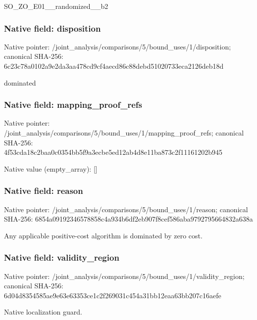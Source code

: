 \documentclass[10pt,a4paper]{article}
\begin{document}
\begingroup\raggedright\sloppy SO\_\allowbreak{}ZO\_\allowbreak{}E01\_\allowbreak{}\_\allowbreak{}randomized\_\allowbreak{}\_\allowbreak{}b2\par\endgroup

\subsubsection{Native field: disposition}
Native pointer: /joint\_\allowbreak{}analysis/comparisons/5/bound\_\allowbreak{}uses/1/disposition; canonical SHA-256: 6c23c78a0102a9e2da3aa478cd9cf4aecd86c88debd51020733eca2126deb18d

\begingroup\raggedright\sloppy dominated\par\endgroup

\subsubsection{Native field: mapping\_\allowbreak{}proof\_\allowbreak{}refs}
Native pointer: /joint\_\allowbreak{}analysis/comparisons/5/bound\_\allowbreak{}uses/1/mapping\_\allowbreak{}proof\_\allowbreak{}refs; canonical SHA-256: 4f53cda18c2baa0c0354bb5f9a3ecbe5ed12ab4d8e11ba873c2f11161202b945

Native value (empty\_\allowbreak{}array): []

\subsubsection{Native field: reason}
Native pointer: /joint\_\allowbreak{}analysis/comparisons/5/bound\_\allowbreak{}uses/1/reason; canonical SHA-256: 6854a09192346578858c4a934b6df2eb907f8cef586aba9792795664832a638a

\begingroup\raggedright\sloppy Any applicable positive-cost algorithm is dominated by zero cost.\par\endgroup

\subsubsection{Native field: validity\_\allowbreak{}region}
Native pointer: /joint\_\allowbreak{}analysis/comparisons/5/bound\_\allowbreak{}uses/1/validity\_\allowbreak{}region; canonical SHA-256: 6d04d8354585ae9e63e63353ce1c2f269031c454a31bb12eaa63bb207c16aefe

\begingroup\raggedright\sloppy Native localization guard.\par\endgroup
\end{document}
